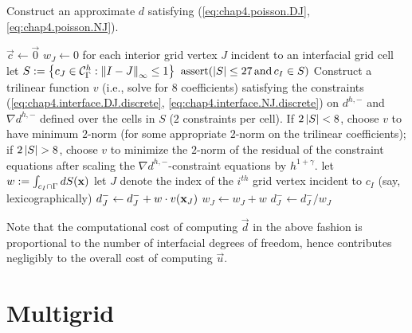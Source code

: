 \begin{algorithm}[htb]
\caption{Construct an approximate $d$ satisfying (\ref{eq:chap4.poisson.DJ}, \ref{eq:chap4.poisson.NJ}).}
\label{alg:chap4.interface.discontinuityremoval.particularsolution}
\begin{algorithmic}[1]
\STATE {}
\STATE $\vec{c} \leftarrow \vec{0}$
\STATE $w_J \leftarrow 0$ for each interior grid vertex $J$ incident to an interfacial grid cell 
    \STATE let $S := \left\lbrace  c_J \in \mathcal{C}^h_{\Gamma} : \left\lVert I - J \right\rVert_{\infty} \leq 1  \right\rbrace$
    \STATE $\operatorname{assert}(\left\lvert S \right\rvert \leq 27 \, \text{and} \, c_I \in S)$
    \STATE Construct a trilinear function $v$ (i.e., solve for $8$ coefficients) satisfying the constraints (\ref{eq:chap4.interface.DJ.discrete}, \ref{eq:chap4.interface.NJ.discrete}) on $d^{h,-}$ and $\nabla d^{h,-}$ defined over the cells in $S$ ($2$ constraints per cell). If $2\left\lvert S \right\rvert < 8$, choose $v$ to have minimum $2$-norm (for some appropriate $2$-norm on the trilinear coefficients); if $2\left\lvert S \right\rvert > 8$, choose $v$ to minimize the $2$-norm of the residual of the constraint equations after scaling the $\nabla d^{h,-}$-constraint equations by $h^{1+\gamma}$.
    \STATE let $w := \int_{c_I \cap \Gamma} dS(\mathbf{x})$ 
        \STATE let $J$ denote the index of the $i^{th}$ grid vertex incident to $c_I$ (say, lexicographically)
        \STATE $d^-_J \leftarrow d^-_J + w \cdot v(\mathbf{x}_J)$ 
        \STATE $w_J \leftarrow w_J + w$
    \ENDFOR
\ENDFOR
{}
    \STATE $d^-_J \leftarrow d^-_J / w_J$ 
\ENDFOR
\end{algorithmic}
\end{algorithm}

Note that the computational cost of computing $\vec{d}$ in the above fashion is proportional to the number of interfacial degrees of freedom, hence contributes negligibly to the overall cost of computing $\vec{u}$.

\section{Multigrid} \label{sec:chap4.multigrid}

